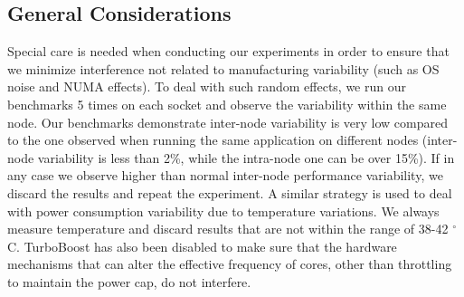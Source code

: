 \subsection{General Considerations}
Special care is needed when conducting our experiments in order to ensure that we minimize
interference not related to manufacturing variability (such as OS noise and NUMA effects).
To deal with such random effects, we run our benchmarks 5 times on each socket and observe 
the variability within the same node.  Our benchmarks demonstrate inter-node variability
is very low compared to the one observed when running the same application on
different nodes (inter-node variability is less than 2\%, while the intra-node one can be
over 15\%).  If in any case we observe higher than normal inter-node performance
variability, we discard the results and repeat the experiment.  A similar strategy is used
to deal with power consumption variability due to temperature variations.  We always
measure temperature and discard results that are not within the range of 38-42 $^\circ$C.
TurboBoost has also been disabled to make sure that the hardware mechanisms that can alter
the effective frequency of cores, other than throttling to maintain the power cap, 
do not interfere.  

